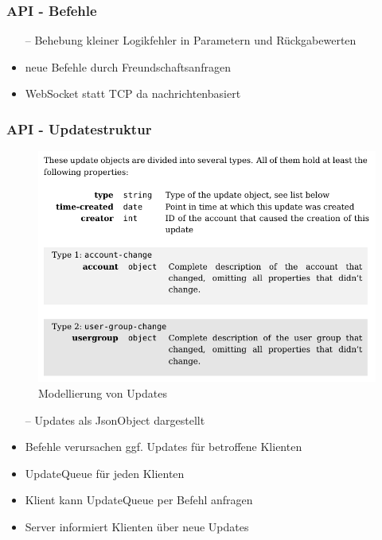 \documentclass[aspectratio=1610]{beamer}
\begin{document}

	\begin{frame}[plain]
		\frametitle{API - Befehle}
			\begin{itemize}
				\item[--] Behebung kleiner Logikfehler in Parametern und Rückgabewerten
				\item<2->[--] neue Befehle durch Freundschaftsanfragen
				\item<3->[--] WebSocket statt TCP da nachrichtenbasiert
			\end{itemize}
		\end{frame}

		\begin{frame}[plain]
			\frametitle{API - Updatestruktur}
			\begin{minipage}{0.55\textwidth}
			\begin{figure}[h]
				\centering
				\includegraphics[width=1\textwidth]{images/Updates.png}
				\caption{Modellierung von Updates}
			\end{figure}
			\end{minipage}%
			\begin{minipage}{0.45\textwidth}
			\begin{itemize}
				\item[--] Updates als JsonObject dargestellt
				\item<2->[--] Befehle verursachen ggf. Updates für betroffene Klienten
				\item<3->[--] UpdateQueue für jeden Klienten
				\item<4->[--] Klient kann UpdateQueue per Befehl anfragen
				\item<5->[--] Server informiert Klienten über neue Updates

			\end{itemize}
			\end{minipage}
	\end{frame}
\end{document}
